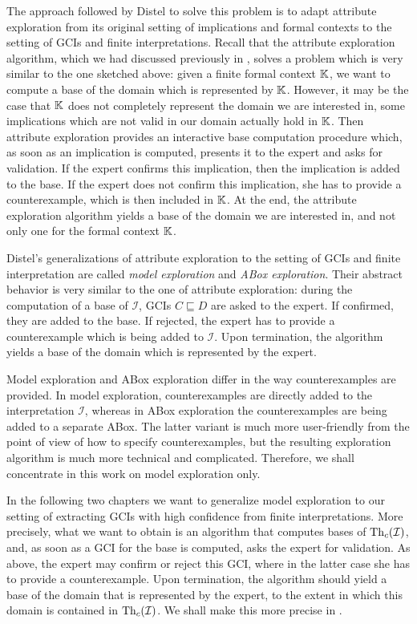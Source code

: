 The approach followed by Distel to solve this problem is to adapt attribute exploration
from its original setting of implications and formal contexts to the setting of GCIs and
finite interpretations.  Recall that the attribute exploration algorithm, which we had
discussed previously in , solves a problem which is very similar to
the one sketched above: given a finite formal context ${\mathbb{K}}$, we want to compute a base
of the domain which is represented by ${\mathbb{K}}$.  However, it may be the case that ${\mathbb{K}}$
does not completely represent the domain we are interested in, \ie some implications which
are not valid in our domain actually hold in ${\mathbb{K}}$.  Then attribute exploration
provides an interactive base computation procedure which, as soon as an implication is
computed, presents it to the expert and asks for validation.  If the expert confirms this
implication, then the implication is added to the base.  If the expert does not confirm
this implication, she has to provide a counterexample, which is then included in ${\mathbb{K}}$.
At the end, the attribute exploration algorithm yields a base of the domain we are
interested in, and not only one for the formal context ${\mathbb{K}}$.

Distel's generalizations of attribute exploration to the setting of GCIs and finite
interpretation are called \emph{model exploration} and \emph{ABox exploration}.  Their
abstract behavior is very similar to the one of attribute exploration: during the
computation of a base of $\mathcal{I}$, GCIs $C \sqsubseteq D$ are asked to the expert.
If confirmed, they are added to the base.  If rejected, the expert has to provide a
counterexample which is being added to $\mathcal{I}$.  Upon termination, the algorithm
yields a base of the domain which is represented by the expert.

Model exploration and ABox exploration differ in the way counterexamples are provided.  In
model exploration, counterexamples are directly added to the interpretation $\mathcal{I}$,
whereas in ABox exploration the counterexamples are being added to a separate ABox.  The
latter variant is much more user-friendly from the point of view of how to specify
counterexamples, but the resulting exploration algorithm is much more technical and
complicated.  Therefore, we shall concentrate in this work on model exploration only.

In the following two chapters we want to generalize model exploration to our setting of
extracting GCIs with high confidence from finite interpretations.  More precisely, what we
want to obtain is an algorithm that computes bases of $\operatorname{Th}_c(\mathcal{I})$, and, as soon
as a GCI for the base is computed, asks the expert for validation.  As above, the expert
may confirm or reject this GCI, where in the latter case she has to provide a
counterexample.  Upon termination, the algorithm should yield a base of the domain that
is represented by the expert, to the extent in which this domain is contained in
$\operatorname{Th}_c(\mathcal{I})$.  We shall make this more precise in .

